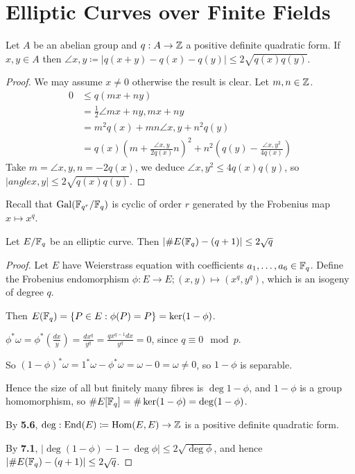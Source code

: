 \documentclass[10pt,a4paper]{article}
\begin{document}
\section{Elliptic Curves over Finite Fields}
\begin{lemma}
  Let $A$ be an abelian group and $q:A \to \mathbb{Z}$ a positive definite quadratic form. If $x, y \in A$ then $\angle{x, y}\coloneqq |q(x + y)-q(x)-q(y)|\leq 2 \sqrt{q(x)q(y)}$.
\end{lemma}
\begin{proof}
  We may assume $x \neq 0$ otherwise the result is clear. Let $m,n \in \mathbb{Z}$.
  \begin{align*}
      0 & \leq q(mx+ny)\\
      &=\frac{1}{2}\angle{mx+ny,mx+ny} \\
      &= m^2q(x) + mn\angle{x,y} + n^2q(y)\\
      &= q(x)\left(m+\frac{\angle{x,y}}{2q(x)}n\right)^2 + n^2\left(q(y)-\frac{\angle{x,y}^2}{4q(x)}\right)
  \end{align*}
  Take $m = \angle{x,y}, n = -2q(x)$, we deduce $\angle{x,y}^2 \leq 4q(x)q(y)$, so $|angle{x,y}| \leq 2\sqrt{q(x)q(y)}$.
\end{proof}
Recall that $\operatorname{Gal}(\mathbb{F}_{q^r}/\mathbb{F}_q)$ is cyclic of order $r$ generated by the Frobenius map $x \mapsto x^q$.
\begin{theorem}[Hasse]
  Let $E/\mathbb{F}_q$ be an elliptic curve. Then $\lvert\#E(\mathbb{F}_q)-(q+1)\rvert\leq 2\sqrt{q}$
\end{theorem}
\begin{proof}
  Let $E$ have Weierstrass equation with coefficients $a_1, \ldots, a_6 \in \mathbb{F}_q$. Define the Frobenius endomorphism $\phi:E \to E; (x,y) \mapsto (x^q, y^q)$, which is an isogeny of degree $q$.

  Then $E(\mathbb{F}_q) = \{P \in E: \phi(P) = P\} = \ker(1-\phi)$.

  $\phi^{\ast}\omega = \phi^\ast\left(\frac{dx}{y}\right) = \frac{dx^q}{y^q} = \frac{qx^{q-1}dx}{y^q} = 0$, since $q \equiv 0 \mod p.$

  So $(1-\phi)^\ast \omega = 1^\ast \omega - \phi^\ast \omega = \omega - 0 = \omega \neq 0$, so $1-\phi$ is separable.

  Hence the size of all but finitely many fibres is $\deg 1-\phi$, and $1-\phi$ is a group homomorphism, so $\#E[\mathbb{F}_q] = \#\ker(1-\phi) = \deg(1-\phi)$.

  By \textbf{5.6}, $\deg :\text{End}(E) \coloneqq \operatorname{Hom}(E,E) \to \mathbb{Z}$ is a positive definite quadratic form.

  By \textbf{7.1}, $|\deg(1-\phi)-1-\deg\phi| \leq 2\sqrt{\deg \phi}$, and hence $|\#E(\mathbb{F}_q) - (q+1)| \leq 2\sqrt{q}$.
\end{proof}
\end{document}
